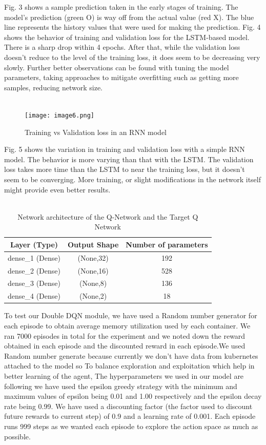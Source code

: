 \documentclass[conference]{IEEEtran}
\begin{document}
Fig. 3 shows a sample prediction taken in the early stages of training. The model’s prediction (green O)  is way off from the actual value (red X). The blue line represents the history values that were used for making the prediction. Fig. 4 shows the behavior of training and validation loss for the LSTM-based model. There is a sharp drop within 4 epochs. After that, while the validation loss doesn’t reduce to the level of the training loss, it does seem to be decreasing very slowly. Further better observations can be found with tuning the model parameters, taking approaches to mitigate overfitting such as getting more samples, reducing network size. \\ \\
\begin{figure}[htbp]
\centerline{\texttt{[image: image6.png]}}
\caption{Training vs Validation loss in an RNN model}
\label{fig}
\end{figure}
Fig. 5 shows the variation in training and validation loss with a simple RNN model. The behavior is more varying than that with the LSTM. The validation loss takes more time than the LSTM to near the training loss, but it doesn’t seem to be converging. More training, or slight modifications in the network itself might provide even better results. \\ \\

\begin{table}[htbp]
\caption{Network architecture of the Q-Network and the Target Q Network}
\begin{center}
\begin{tabular}{ |c|c|c| } 
 \hline
 Layer (Type) & Output Shape & Number of parameters \\ 
\hline
 dense_1 (Dense) & (None,32) & 192 \\ 
 \hline
 dense_2 (Dense) & (None,16) & 528 \\ 
 \hline
 dense_3 (Dense) & (None,8) & 136 \\ 
\hline
 dense_4 (Dense) & (None,2) & 18 \\ 
 \hline
\end{tabular}
\label{tab2}
\end{center}
\end{table}

To test our Double DQN module, we have used a Random number generator for each episode  to obtain average memory utilization used by each container. We ran 7000 episodes in total for the experiment and we noted down the reward obtained in each episode and the discounted reward in each episode.We used Random number generate because currently we don't have data from kubernetes attached to the model so To balance exploration and exploitation which help in better learning of the agent, The hyperparameters we used in our model are following we have used the epsilon greedy strategy with the minimum and maximum values of epsilon being 0.01 and 1.00 respectively and the epsilon decay rate being 0.99. We have used a discounting factor (the factor used to discount future rewards to current step) of 0.9 and a learning rate of 0.001. Each episode runs 999 steps as we wanted each episode to explore the action space as much as possible. \\
\end{document}
